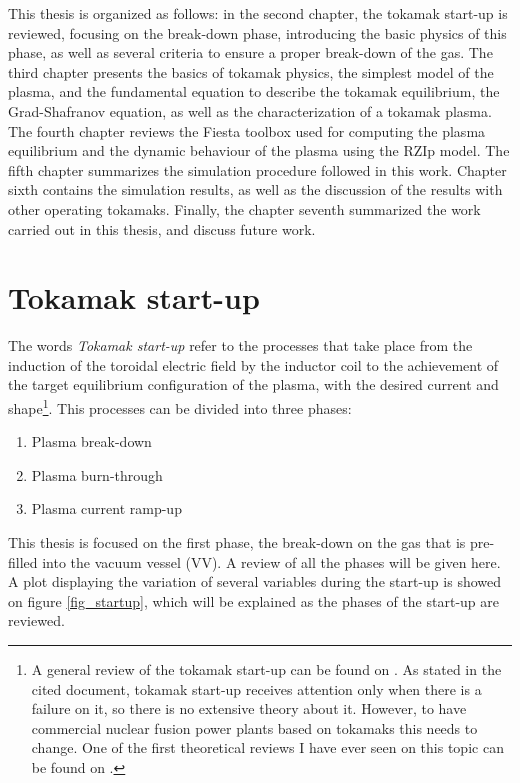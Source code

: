 \documentclass[a4paper,12pt,oneside]{book}
\begin{document}
This thesis is organized as follows: in the second chapter, the tokamak start-up is reviewed, focusing on the break-down phase, introducing the basic physics of this phase, as well as several criteria to ensure a proper break-down of the gas.
The third chapter presents the basics of tokamak physics, the simplest model of the plasma, and the fundamental equation to describe the tokamak equilibrium, the Grad-Shafranov equation, as well as the characterization of a tokamak plasma. 
The fourth chapter reviews the Fiesta toolbox used for computing the plasma equilibrium and the dynamic behaviour of the plasma using the RZIp model.
The fifth chapter summarizes the simulation procedure followed in this work.
Chapter sixth contains the simulation results, as well as the discussion of the results with other operating tokamaks.
Finally, the chapter seventh summarized the work carried out in this thesis, and discuss future work.





\chapter{Tokamak start-up}

The words \textit{Tokamak start-up} refer to the processes that take place from the induction of the toroidal electric field by the inductor coil to the achievement of the target equilibrium configuration of the plasma, with the desired current and shape\footnote{A general review of the tokamak start-up can be found on \cite{MuellerStartup}. As stated in the cited document, tokamak start-up receives attention only when there is a failure on it, so there is no extensive theory about it. However, to have commercial nuclear fusion power plants based on tokamaks this needs to change. One of the first theoretical reviews I have ever seen on this topic can be found on \cite{ITER_2019}.}. This processes can be divided into three phases:
%
%
\begin{enumerate}
	\item Plasma break-down
	\item Plasma burn-through
	\item Plasma current ramp-up
\end{enumerate}

This thesis is focused on the first phase, the break-down on the gas that is pre-filled into the vacuum vessel (VV). A review of all the phases will be given here. A plot displaying the variation of several variables during the start-up is showed on figure \ref{fig_startup}, which will be explained as the phases of the start-up are reviewed.
\end{document}
